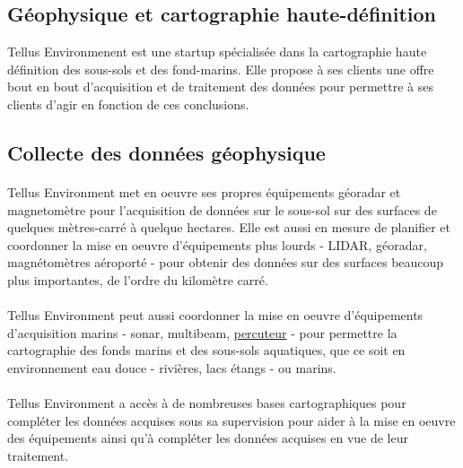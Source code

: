\documentclass[12pt,a4paper]{report}
\begin{document}
	\subsection{Géophysique et cartographie haute-définition}
	Tellus Environmenent est une startup spécialisée dans la cartographie haute définition des sous-sols et des fond-marins. Elle propose à ses clients une offre bout en bout d'acquisition et de traitement des données pour permettre à ses clients d'agir en fonction de ces conclusions.
	
	\subsection{Collecte des données géophysique}
	
	\paragraph*{} Tellus Environment met en oeuvre ses propres équipements géoradar et magnetomètre pour l'acquisition de données sur le sous-sol sur des surfaces de quelques mètres-carré à quelque hectares. Elle est aussi en mesure de planifier et coordonner la mise en oeuvre d'équipements plus lourds - LIDAR, géoradar, magnétomètres aéroporté - pour obtenir des données sur des surfaces beaucoup plus importantes, de l'ordre du kilomètre carré.
	
	
	\paragraph*{} Tellus Environment peut aussi coordonner la mise en oeuvre d'équipements d'acquisition marins - sonar, multibeam, \underline{percuteur}  - pour permettre la cartographie des fonds marins et des sous-sols aquatiques, que ce soit en environnement eau douce - rivières, lacs étangs - ou marins. 
	
	\paragraph*{} Tellus Environment a accès à de nombreuses bases cartographiques pour compléter les données acquises sous sa supervision pour aider à la mise en oeuvre des équipements ainsi qu'à compléter les données acquises en vue de leur traitement.
\end{document}
